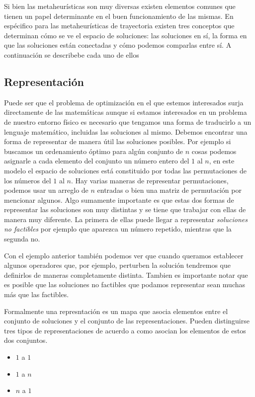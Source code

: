 Si bien las metaheurísticas son muy diversas existen elementos comunes que tienen un papel determinante en el buen funcionamiento de las mismas. En espécifico para las metaheurísticas de trayectoria existen tres conceptos que determinan cómo se ve el espacio de soluciones: las soluciones en sí, la forma en que las soluciones están conectadas y cómo podemos comparlas entre sí. A continuación se describebe cada uno de ellos
\subsection{Representación}
Puede ser que el problema de optimización en el que estemos interesados surja directamente de las matemáticas aunque si estamos interesados en un problema de nuestro entorno físico es necesario que tengamos una forma de traducirlo a un lenguaje matemático, incluidas las soluciones al mismo. Debemos encontrar una forma de representar de manera útil las soluciones posibles.
Por ejemplo si buscamos un ordenamiento óptimo para algún conjunto de $n$ cosas podemos asignarle a cada elemento del conjunto un número entero del $1$ al $n$, en este modelo el espacio de soluciones está constituido por todas las permutaciones de los números del $1$ al $n$. Hay varias maneras de representar permutaciones, podemos usar un arreglo de $n$ entradas o bien una matriz de permutación por mencionar algunos. Algo sumamente importante es que estas dos formas de representar las soluciones son muy distintas y se tiene que trabajar con ellas de manera muy diferente. La primera de ellas puede llegar a representar \textit{soluciones no factibles} por ejemplo que aparezca un número repetido, mientras que la segunda no.

Con el ejemplo anterior también podemos ver que cuando queramos establecer algunos operadores que, por ejemplo, perturben la solución tendremos que definirlos de maneras completamente distinta. Tambien es importante notar que es posible que las soluciones no factibles que podamos representar sean muchas más que las factibles.

Formalmente una represntación es un mapa que asocia elementos entre el conjunto de soluciones y el conjunto de las representaciones. Pueden distinguirse tres tipos de representaciones\cite{Cheng1996} de acuerdo a como asocian los elementos de estos dos conjuntos.
\begin{itemize}
    \item $1$ a $1$
    \item $1$ a $n$
    \item $n$ a $1$
\end{itemize}

